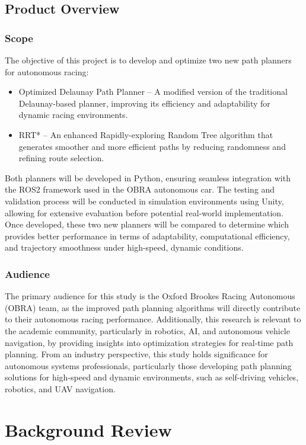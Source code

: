 \documentclass[a4paper,11pt]{report}
\begin{document}
\section{Product Overview}
\subsection{Scope}
The objective of this project is to develop and optimize two new path planners for autonomous racing:
\begin{itemize}
    \item Optimized Delaunay Path Planner – A modified version of the traditional Delaunay-based planner, improving its efficiency and adaptability for dynamic racing environments.
    \item RRT* – An enhanced Rapidly-exploring Random Tree algorithm that generates smoother and more efficient paths by reducing randomness and refining route selection.
\end{itemize}
Both planners will be developed in Python, ensuring seamless integration with the ROS2 framework used in the OBRA autonomous car. The testing and validation process will be conducted in simulation environments using Unity, allowing for extensive evaluation before potential real-world implementation.
Once developed, these two new planners will be compared to determine which provides better performance in terms of adaptability, computational efficiency, and trajectory smoothness under high-speed, dynamic conditions.

\subsection{Audience}
The primary audience for this study is the Oxford Brookes Racing Autonomous (OBRA) team, as the improved path planning algorithms will directly contribute to their autonomous racing performance.
Additionally, this research is relevant to the academic community, particularly in robotics, AI, and autonomous vehicle navigation, by providing insights into optimization strategies for real-time path planning.
From an industry perspective, this study holds significance for autonomous systems professionals, particularly those developing path planning solutions for high-speed and dynamic environments, such as self-driving vehicles, robotics, and UAV navigation.


\newpage

\chapter{Background Review}
\end{document}
